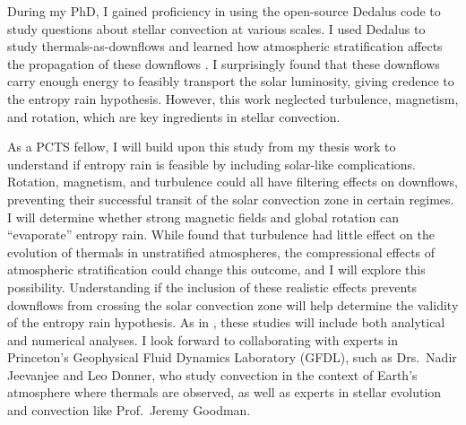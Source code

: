\documentclass[11pt, preprint]{aastex}
\begin{document}
During my PhD, I gained proficiency in using the open-source Dedalus \citep{burns&all2019} code to study questions about stellar convection at various scales.
I used Dedalus to study thermals-as-downflows and learned how atmospheric stratification affects the propagation of these downflows \citep{andersLB2019}.
I surprisingly found that these downflows carry enough energy to feasibly transport the solar luminosity, giving credence to the entropy rain hypothesis.
However, this work neglected turbulence, magnetism, and rotation, which are key ingredients in stellar convection.

As a PCTS fellow, I will build upon this study from my thesis work to understand if entropy rain is feasible by including solar-like complications.
Rotation, magnetism, and turbulence could all have filtering effects on downflows, preventing their successful transit of the solar convection zone in certain regimes.
I will determine whether strong magnetic fields and global rotation can ``evaporate'' entropy rain.
While \citet{lecoanet&jeevanjee2019} found that turbulence had little effect on the evolution of thermals in unstratified atmospheres, the compressional effects of atmospheric stratification could change this outcome, and I will explore this possibility.
Understanding if the inclusion of these realistic effects prevents downflows from crossing the solar convection zone will help determine the validity of the entropy rain hypothesis.
As in \citet{andersLB2019}, these studies will include both analytical and numerical analyses.
I look forward to collaborating with experts in Princeton's Geophysical Fluid Dynamics Laboratory (GFDL), such as Drs.~Nadir Jeevanjee and Leo Donner, who study convection in the context of Earth's atmosphere where thermals are observed, as well as experts in stellar evolution and convection like Prof.~Jeremy Goodman.

\vspace{-24pt}
\end{document}
